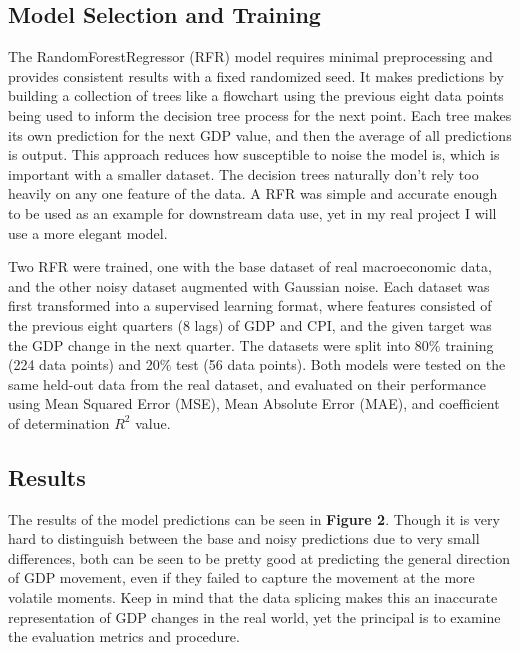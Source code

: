 \documentclass[10pt,twocolumn]{article}
\begin{document}
\subsection{Model Selection and Training}
The RandomForestRegressor (RFR) model requires minimal preprocessing and provides consistent results with a fixed randomized seed. It makes predictions by building a collection of trees like a flowchart using the previous eight data points being used to inform the decision tree process for the next point. Each tree makes its own prediction for the next GDP value, and then the average of all predictions is output. This approach reduces how susceptible to noise the model is, which is important with a smaller dataset. The decision trees naturally don’t rely too heavily on any one feature of the data. A RFR was simple and accurate enough to be used as an example for downstream data use, yet in my real project I will use a more elegant model.

Two RFR were trained, one with the base dataset of real macroeconomic data, and the other noisy dataset augmented with Gaussian noise. Each dataset was first transformed into a supervised learning format, where features consisted of the previous eight quarters (8 lags) of GDP and CPI, and the given target was the GDP change in the next quarter. The datasets were split into 80\% training (224 data points) and 20\% test (56 data points). Both models were tested on the same held-out data from the real dataset, and evaluated on their performance using Mean Squared Error (MSE), Mean Absolute Error (MAE), and coefficient of determination $R^2$ value. 

\subsection{Results}

The results of the model predictions can be seen in \textbf{Figure 2}. Though it is very hard to distinguish between the base and noisy predictions due to very small differences, both can be seen to be pretty good at predicting the general direction of GDP movement, even if they failed to capture the movement at the more volatile moments. Keep in mind that the data splicing makes this an inaccurate representation of GDP changes in the real world, yet the principal is to examine the evaluation metrics and procedure. 
\end{document}
